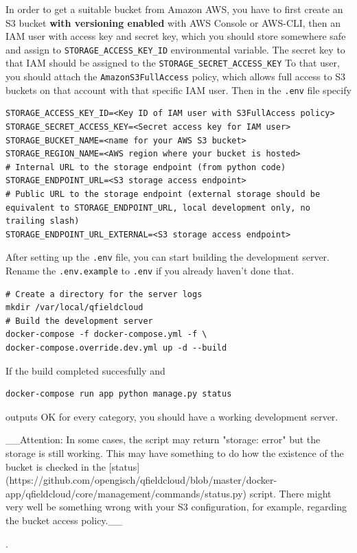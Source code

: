 \documentclass{article}
\begin{document}
In order to get a suitable bucket from Amazon AWS, you have to first create an S3 bucket \textbf{with versioning enabled} with AWS Console or AWS-CLI, then an IAM user with access key and secret key, which you should store somewhere safe and assign to \texttt{STORAGE\_ACCESS\_KEY\_ID} environmental variable. The secret key to that IAM should be assigned to the \texttt{STORAGE\_SECRET\_ACCESS\_KEY} To that user, you should attach the \texttt{AmazonS3FullAccess} policy, which allows full access to S3 buckets on that account with that specific IAM user. Then in the \texttt{.env} file specify

\begin{verbatim}
STORAGE_ACCESS_KEY_ID=<Key ID of IAM user with S3FullAccess policy>
STORAGE_SECRET_ACCESS_KEY=<Secret access key for IAM user>
STORAGE_BUCKET_NAME=<name for your AWS S3 bucket>
STORAGE_REGION_NAME=<AWS region where your bucket is hosted>
# Internal URL to the storage endpoint (from python code)
STORAGE_ENDPOINT_URL=<S3 storage access endpoint>
# Public URL to the storage endpoint (external storage should be equivalent to STORAGE_ENDPOINT_URL, local development only, no trailing slash)
STORAGE_ENDPOINT_URL_EXTERNAL=<S3 storage access endpoint>
\end{verbatim}

After setting up the \texttt{.env} file, you can start building the development server. Rename the \texttt{.env.example} to \texttt{.env} if you already haven't done that. 

\begin{verbatim}
# Create a directory for the server logs
mkdir /var/local/qfieldcloud
# Build the development server
docker-compose -f docker-compose.yml -f \ 
docker-compose.override.dev.yml up -d --build
\end{verbatim}

If the build completed succesfully and
\begin{verbatim}
docker-compose run app python manage.py status 
\end{verbatim}
outputs OK for every category, you should have a working development server.

\begin{markdown}
__Attention: In some cases, the script may return "storage: error" but the storage is still working. This may have something to do how the existence of the bucket is checked in the [status](https://github.com/opengisch/qfieldcloud/blob/master/docker-app/qfieldcloud/core/management/commands/status.py) script. There might very well be something wrong with your S3 configuration, for example, regarding the bucket access policy.__
\end{markdown}.
\end{document}
